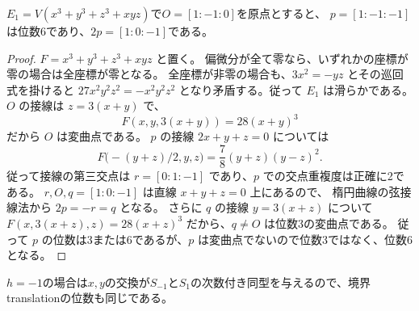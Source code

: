 \begin{lemma}[位数6の具体的な楕円曲線計算]\label{CSBGlem:order-six}
$E_1=V(x^3+y^3+z^3+xyz)$で$O=[1:-1:0]$を原点とすると、
$p=[1:-1:-1]$は位数6であり、$2p=[1:0:-1]$である。
\end{lemma}
\begin{proof}
$F=x^3+y^3+z^3+xyz$ と置く。
偏微分が全て零なら、いずれかの座標が零の場合は全座標が零となる。
全座標が非零の場合も、$3x^2=-yz$ とその巡回式を掛けると
$27x^2y^2z^2=-x^2y^2z^2$ となり矛盾する。従って $E_1$ は滑らかである。
$O$ の接線は $z=3(x+y)$ で、
\[
 F(x,y,3(x+y))=28(x+y)^3
\]
だから $O$ は変曲点である。
$p$ の接線 $2x+y+z=0$ については
\[
 F\bigl(-(y+z)/2,y,z\bigr)=\frac78(y+z)(y-z)^2.
\]
従って接線の第三交点は $r=[0:1:-1]$ であり、$p$ での交点重複度は正確に2である。
$r,O,q=[1:0:-1]$ は直線 $x+y+z=0$ 上にあるので、
楕円曲線の弦接線法から $2p=-r=q$ となる。
さらに $q$ の接線 $y=3(x+z)$ について
$F(x,3(x+z),z)=28(x+z)^3$ だから、$q\ne O$ は位数3の変曲点である。
従って $p$ の位数は3または6であるが、$p$ は変曲点でないので位数3ではなく、位数6となる。
\end{proof}
$h=-1$の場合は$x,y$の交換が$S_{-1}$と$S_1$の次数付き同型を与えるので、境界translationの位数も同じである。
